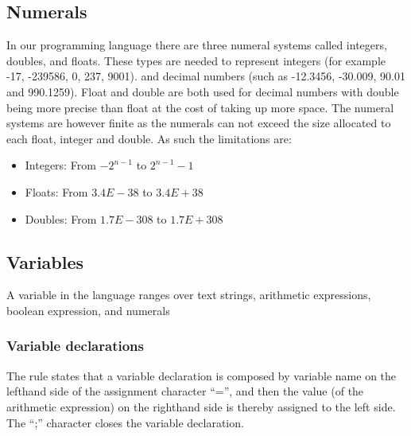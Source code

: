 \subsection{Numerals}
In our programming language there are three numeral systems called integers, doubles, and floats. These types are needed to represent integers (for example -17, -239586, 0, 237, 9001). and decimal numbers (such as -12.3456, -30.009, 90.01 and 990.1259). Float and double are both used for decimal numbers with double being more precise than float at the cost of taking up more space. The numeral systems are however finite as the numerals can not exceed the size allocated to each float, integer and double. As such the limitations are:
\begin{itemize}
\item Integers: From $-2^{n-1}$ to $2^{n-1}-1$
\item Floats: From $3.4E-38$ to $3.4E+38$
\item Doubles: From $1.7E-308$ to $1.7E+308$
\end{itemize}

\subsection{Variables}
A variable in the language ranges over text strings, arithmetic expressions, boolean expression, and numerals


\subsubsection{Variable declarations}\label{sec:analysis:syntax-definition:variable-declaration}
The rule states that a variable declaration is composed by variable name on the lefthand side of the assignment character ``='', and then the value (of the arithmetic expression) on the righthand side is thereby assigned to the left side. The ``;'' character closes the variable declaration.

